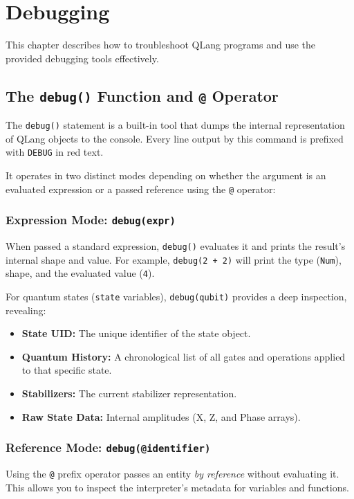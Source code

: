 \section{Debugging}\label{sec:debugging}

This chapter describes how to troubleshoot QLang programs and use the provided debugging tools effectively.

\subsection{The \texttt{debug()} Function and \texttt{@} Operator}\label{sec:debug-function}

The \texttt{debug()} statement is a built-in tool that dumps the internal representation of QLang objects to the console. Every line output by this command is prefixed with \texttt{DEBUG} in red text.

It operates in two distinct modes depending on whether the argument is an evaluated expression or a passed reference using the \texttt{@} operator:

\subsubsection{Expression Mode: \texttt{debug(expr)}}
When passed a standard expression, \texttt{debug()} evaluates it and prints the result's internal shape and value. For example, \texttt{debug(2 + 2)} will print the type (\texttt{Num}), shape, and the evaluated value (\texttt{4}). 

For quantum states (\texttt{state} variables), \texttt{debug(qubit)} provides a deep inspection, revealing:
\begin{itemize}
    \item \textbf{State UID:} The unique identifier of the state object.
    \item \textbf{Quantum History:} A chronological list of all gates and operations applied to that specific state.
    \item \textbf{Stabilizers:} The current stabilizer representation.
    \item \textbf{Raw State Data:} Internal amplitudes (X, Z, and Phase arrays).
\end{itemize}

\subsubsection{Reference Mode: \texttt{debug(@identifier)}}
Using the \texttt{@} prefix operator passes an entity \emph{by reference} without evaluating it. This allows you to inspect the interpreter's metadata for variables and functions.

